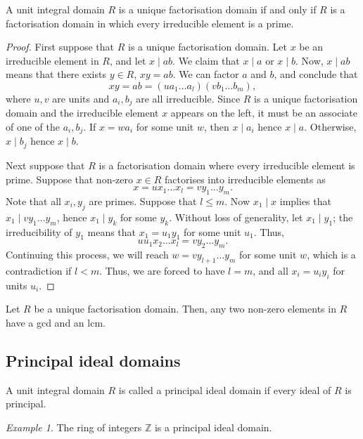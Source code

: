 \documentclass[11pt]{article}
\newcommand{\Z}{\mathbb{Z}}
\theoremstyle{definition}
\theoremstyle{remark}
\newtheorem*{example}{Example}
\numberwithin{equation}{section}
\begin{document}
    \begin{theorem}
        A unit integral domain $R$ is a unique factorisation domain if and only if
        $R$ is a factorisation domain in which every irreducible element is a prime.
    \end{theorem}
    \begin{proof}
        First suppose that $R$ is a unique factorisation domain. Let $x$ be an
        irreducible element in $R$, and let $x \mid ab$. We claim that $x\mid a$ or
        $x \mid b$. Now, $x \mid ab$ means that there exists $y \in R$, $xy = ab$. We
        can factor $a$ and $b$, and conclude that \[
            xy = ab = (ua_1\dots a_l)(vb_1\dots b_m),
        \] where $u, v$ are units and $a_i, b_j$ are all irreducible. Since $R$ is a
        unique factorisation domain and the irreducible element $x$ appears on the
        left, it must be an associate of one of the $a_i, b_j$. If $x = wa_i$ for
        some unit $w$, then $x\mid a_i$ hence $x\mid a$. Otherwise, $x\mid b_j$ hence
        $x\mid b$.

        Next suppose that $R$ is a factorisation domain where every irreducible
        element is prime. Suppose that non-zero $x \in R$ factorises into
        irreducible elements as \[
            x = ux_1\dots x_l = vy_1\dots y_m.
        \] Note that all $x_i, y_j$ are primes. Suppose that $l \leq m$. Now $x_1 \mid
        x$ implies that $x_1 \mid vy_1 \dots y_m$, hence $x_1 \mid y_k$ for some
        $y_k$. Without loss of generality, let $x_1 \mid y_1$; the irreducibility of
        $y_1$ means that $x_1 = u_1y_1$ for some unit $u_1$. Thus, \[
            uu_1x_2 \dots x_l = vy_2 \dots y_m.
        \] Continuing this process, we will reach $w = vy_{l + 1} \dots y_m$ for some
        unit $w$, which is a contradiction if $l < m$. Thus, we are forced to have $l
        = m$, and all $x_i = u_iy_i$ for units $u_i$.
    \end{proof}

    \begin{lemma}
        Let $R$ be a unique factorisation domain. Then, any two non-zero elements in
        $R$ have a gcd and an lcm.
    \end{lemma}


    \subsection{Principal ideal domains}

    \begin{definition}
        A unit integral domain $R$ is called a principal ideal domain if every ideal
        of $R$ is principal.
    \end{definition}
    \begin{example}
        The ring of integers $\Z$ is a principal ideal domain.
    \end{example}
\end{document}
